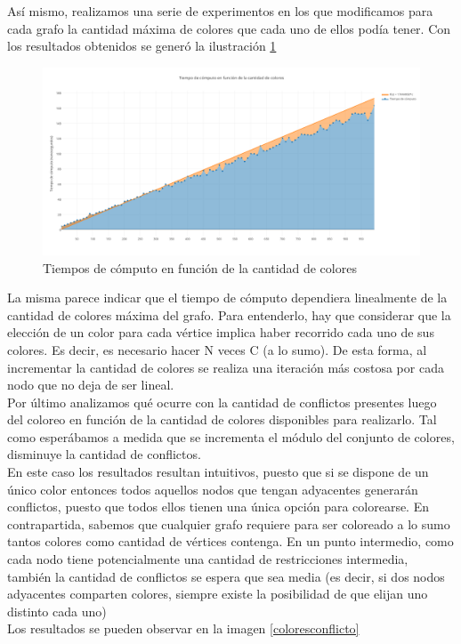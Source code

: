 Así mismo, realizamos una serie de experimentos en los que modificamos para cada grafo la cantidad máxima de colores que cada uno de ellos podía tener. Con los resultados obtenidos se generó la ilustración \ref{colorestiempo}

 \begin{figure}[H]
    \begin{center}
  	\includegraphics[width=18cm]{imagenes/ej3/colorestiempo.png}
 	\caption{Tiempos de cómputo en función de la cantidad de colores}
 	\label{colorestiempo}
    \end{center}
  \end{figure}

La misma parece indicar que el tiempo de cómputo dependiera linealmente de la cantidad de colores máxima del grafo. Para entenderlo, hay que considerar que la elección de un color para cada vértice implica haber recorrido cada uno de sus colores. Es decir, es necesario hacer N veces C (a lo sumo). De esta forma, al incrementar la cantidad de colores se realiza una iteración más costosa por cada nodo que no deja de ser lineal.\\

Por último analizamos qué ocurre con la cantidad de conflictos presentes luego del coloreo en función de la cantidad de colores disponibles para realizarlo. Tal como esperábamos a medida que se incrementa el módulo del conjunto de colores, disminuye la cantidad de conflictos. \\
En este caso los resultados resultan intuitivos, puesto que si se dispone de un único color entonces todos aquellos nodos que tengan adyacentes generarán conflictos, puesto que todos ellos tienen una única opción para colorearse. En contrapartida, sabemos que cualquier grafo requiere para ser coloreado a lo sumo tantos colores como cantidad de vértices contenga. En un punto intermedio, como cada nodo tiene potencialmente una cantidad de restricciones intermedia, también la cantidad de conflictos se espera que sea media (es decir, si dos nodos adyacentes comparten colores, siempre existe la posibilidad de que elijan uno distinto cada uno)  \\
Los resultados se pueden observar en la imagen \ref{coloresconflicto}



